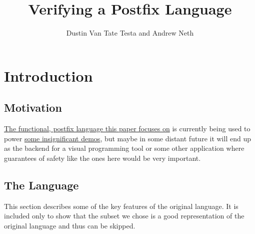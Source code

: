 \documentclass{article}
\title{Verifying a Postfix Language}
\author{Dustin Van Tate Testa and Andrew Neth}
\begin{document}
\maketitle

\section{Introduction}
\subsection{Motivation}
\href{https://github.com/dvtate/postfix-haskell}{The functional, postfix language this paper focuses on} is currently being used to power \href{https://ridder.xyz/game}{some insignificant demos}, but maybe in some distant future it will end up as the backend for a visual programming tool or some other application where guarantees of safety like the ones here would be very important.

\subsection{The Language}
This section describes some of the key features of the original language. It is included only to show that the subset we chose is a good representation of the original language and thus can be skipped.
\end{document}
